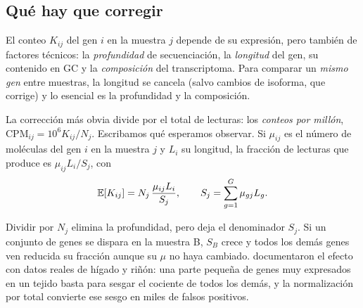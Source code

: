 \subsection{Qué hay que corregir}

El conteo $K_{ij}$ del gen $i$ en la muestra $j$ depende de su expresión, pero también de factores técnicos: la \emph{profundidad} de secuenciación, la \emph{longitud} del gen, su contenido en GC y la \emph{composición} del transcriptoma. Para comparar un \emph{mismo gen} entre muestras, la longitud se cancela (salvo cambios de isoforma, que  corrige) y lo esencial es la profundidad y la composición.

La corrección más obvia divide por el total de lecturas: los \emph{conteos por millón}, $\mathrm{CPM}_{ij}=10^6K_{ij}/N_j$. Escribamos qué esperamos observar. Si $\mu_{ij}$ es el número de moléculas del gen $i$ en la muestra $j$ y $L_i$ su longitud, la fracción de lecturas que produce es $\mu_{ij}L_i/S_j$, con
\begin{equation}\label{eq:11-composicion}
\mathbb{E}[K_{ij}]=N_j\,\frac{\mu_{ij}L_i}{S_j},\qquad S_j=\sum_{g=1}^{G}\mu_{gj}L_g.
\end{equation}

\begin{simbolos}
\end{simbolos}

Dividir por $N_j$ elimina la profundidad, pero deja el denominador $S_j$. Si un conjunto de genes se dispara en la muestra B, $S_B$ crece y todos los demás genes ven reducida su fracción aunque su $\mu$ no haya cambiado. \textcite{c11-robinson2010tmm} documentaron el efecto con datos reales de hígado y riñón: una parte pequeña de genes muy expresados en un tejido basta para sesgar el cociente de todos los demás, y la normalización por total convierte ese sesgo en miles de falsos positivos.

